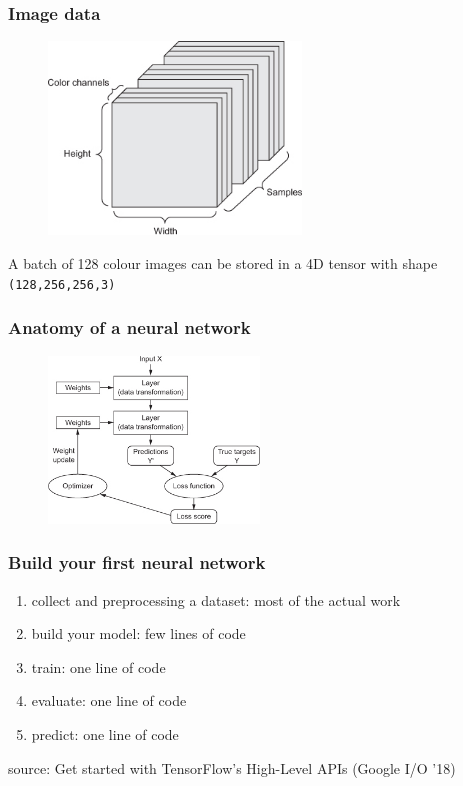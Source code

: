 \begin{frame}
	\frametitle{Image data}

	\begin{figure}
                \includegraphics[width=0.6\textwidth]{Pics/image.jpg}
        \end{figure}

	\small{A batch of 128 colour images can be stored in a 4D tensor with shape \texttt{(128,256,256,3)}}

\end{frame}

\begin{frame}
        \frametitle{Anatomy of a neural network}

        \begin{figure}
                \includegraphics[width=0.5\textwidth]{Pics/nn_scheme.jpg}
        \end{figure}

\end{frame}


\begin{frame}
	\frametitle{Build your first neural network}

	\begin{enumerate}
		\item collect and preprocessing a dataset: most of the actual work
		\pause
		\item build your model: few lines of code
		\pause
		\item train: one line of code
		\pause
		\item evaluate: one line of code
		\pause
		\item predict: one line of code
	\end{enumerate}

	\bigskip
	\tiny{source: Get started with TensorFlow's High-Level APIs (Google I/O '18)}

\end{frame}


